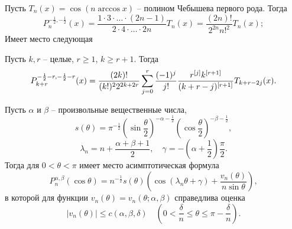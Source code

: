 Пусть $T_n(x)=\cos(n\arccos x)$ -- полином Чебышева первого рода. Тогда \cite{Sege}
\begin{equation}\label{3.12}
P_n^{-\frac{1}{2},-\frac{1}{2}}(x)=\frac{1\cdot3\cdot\ldots\cdot(2n-1)}
{2\cdot4\cdot\ldots\cdot2n}T_n(x)=\frac{(2n)!}{2^{2n}{n!}^2}T_n(x);
\end{equation}
Имеет место следующая

\begin{lemma} Пусть  $k,r$ -- целые, $r\ge1$,
     $k\ge r+1$. Тогда
 $$
P_{k+r}^{-\frac12-r,-\frac12-r}(x)={(2k)!\over(k!)^22^{2k+2r}}\sum_{j=0}^r{(-1)^j\over j!}
{r^{[j]}k^{[r+1]}\over(k+r-j)^{[r+1]}}T_{k+r-2j}(x).
     $$
\end{lemma}

Пусть $\alpha$ и $\beta$ -- произвольные вещественные числа,
$$
s(\theta)=\pi^{-\frac12}\left(\sin\frac{\theta}{2}\right)^{-\alpha-\frac12}
\left(\cos\frac{\theta}{2}\right)^{-\beta-\frac12},
$$
$$
\lambda_n=n+\frac{\alpha+\beta+1}{2}, \quad\gamma=-
\left(\alpha+\frac{1}{2}\right)\frac{\pi}{2}.
$$
Тогда для $0<\theta<\pi$ имеет место асимптотическая формула
\begin{equation}\label{3.13}
P_n^{\alpha,\beta}(\cos\theta)=n^{-\frac12}s(\theta)
\left(\cos(\lambda_n\theta+\gamma)+
\frac{v_n(\theta)}{n\sin\theta}\right),
\end{equation}
в которой для функции $v_n(\theta)=v_n(\theta;\alpha,\beta)$
справедлива оценка
\begin{equation}\label{3.14}
|v_n(\theta)|\le c(\alpha,\beta,\delta)\quad
 \left(0<\frac{\delta}{n}\le\theta\le\pi-\frac{\delta}{n}\right).
\end{equation}





